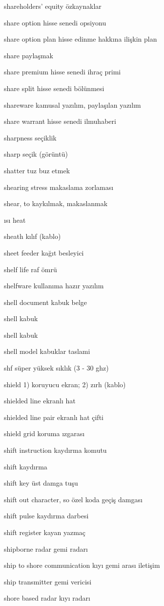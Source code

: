 \documentclass[12pt,fleqn]{article}\usepackage{../../common}
\begin{document}
shareholders' equity özkaynaklar

share option hisse senedi opsiyonu

share option plan hisse edinme hakkına ilişkin plan

share paylaşmak

share premium hisse senedi ihraç primi

share split hisse senedi bölünmesi

shareware kamusal yazılım, paylaşılan yazılım

share warrant hisse senedi ilmuhaberi

sharpness seçiklik

sharp seçik (görüntü)

shatter tuz buz etmek

shearing stress makaslama zorlaması

shear, to kaykılmak, makaslanmak

ısı heat

sheath kılıf (kablo)

sheet feeder kağıt besleyici

shelf life raf ömrü

shelfware kullanıma hazır yazılım

shell document kabuk belge

shell kabuk

shell kabuk

shell model kabuklar taslami

shf süper yüksek sıklık (3 - 30 ghz)

shield 1) koruyucu ekran; 2) zırh (kablo)

shielded line ekranlı hat

shielded line pair ekranlı hat çifti

shield grid koruma ızgarası

shift instruction kaydırma komutu

shift kaydırma

shift key üst damga tuşu

shift out character, so özel koda geçiş damgası

shift pulse kaydırma darbesi

shift register kayan yazmaç

shipborne radar gemi radarı

ship to shore communication kıyı gemi arası iletişim

ship transmitter gemi vericisi

shore based radar kıyı radarı
\end{document}
